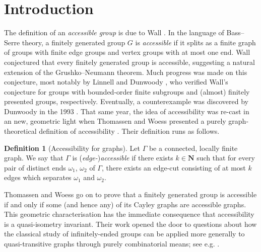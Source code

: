 \documentclass[11pt,a4paper]{amsart}
\newcommand{\N}{\mathbf{N}}
\theoremstyle{definition}
\newtheorem{definition}[theorem]{Definition}
\begin{document}
\maketitle





\section{Introduction}


The definition of an \emph{accessible group} is due to Wall \cite{wall1971pairs}. In the language of Bass--Serre theory, a finitely generated group $G$ is \emph{accessible} if it splits as a finite graph of groups with finite edge groups and vertex groups with at most one end. Wall conjectured that every finitely generated group is accessible, suggesting a natural extension of the Grushko--Neumann theorem. 
Much progress was made on this conjecture, most notably by Linnell \cite{linnell1983accessibility} and Dunwoody \cite{dunwoody1985accessibility}, who verified Wall's conjecture for groups with bounded-order finite subgroups and (almost) finitely presented groups, respectively. Eventually, a counterexample was discovered by Dunwoody in the 1993 \cite{dunwoody1993inaccessible}. 
That same year, the idea of accessibility was re-cast in an new, geometric light when Thomassen and Woess presented a purely graph-theoretical definition of accessibility \cite{thomassen1993vertex}. Their definition runs as follows.

\begin{definition}[Accessibility for graphs]\label{def:TW}
    Let $\Gamma$ be a connected, locally finite graph. We say that $\Gamma$ is (\emph{edge-})\emph{accessible} if there exists $k \in \N$ such that for every pair of distinct ends $\omega_1$, $\omega_2$ of $\Gamma$, there exists an edge-cut consisting of at most $k$ edges which separates $\omega_1$ and $\omega_2$. 
\end{definition}

Thomassen and Woess go on to prove that a finitely generated group is accessible if and only if some (and hence any) of its Cayley graphs are accessible graphs. This geometric characterisation has the immediate consequence that accessibility is a quasi-isometry invariant. Their work opened the door to questions about how the classical study of infinitely-ended groups can be applied more generally to quasi-transitive graphs through purely combinatorial means; see e.g. \cites{hamann2022stallings, moller1996accessibility, esperet2024structure, macmanus2023accessibility}.
\end{document}
